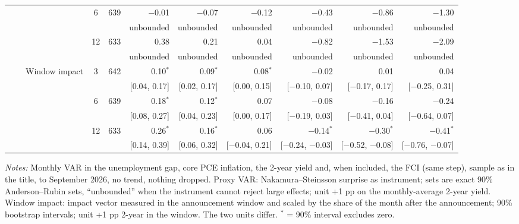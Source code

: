 \begin{table}[tp]
{\begin{tabular}{lllcrrrrrrr}
 &  &  & 6 & 639 & $-$0.01 & $-$0.07 & $-$0.12 & $-$0.43 & $-$0.86 & $-$1.30\\
 & & & & & {\tiny unbounded} & {\tiny unbounded} & {\tiny unbounded} & {\tiny unbounded} & {\tiny unbounded} & {\tiny unbounded}\\
 &  &  & 12 & 633 & 0.38 & 0.21 & 0.04 & $-$0.82 & $-$1.53 & $-$2.09\\
 & & & & & {\tiny unbounded} & {\tiny unbounded} & {\tiny unbounded} & {\tiny unbounded} & {\tiny unbounded} & {\tiny unbounded}\\
 &  & Window impact & 3 & 642 & 0.10$^{*}$ & 0.09$^{*}$ & 0.08$^{*}$ & $-$0.02 & 0.01 & 0.04\\
 & & & & & {\tiny [0.04, 0.17]} & {\tiny [0.02, 0.17]} & {\tiny [0.00, 0.15]} & {\tiny [$-$0.10, 0.07]} & {\tiny [$-$0.17, 0.17]} & {\tiny [$-$0.25, 0.31]}\\
 &  &  & 6 & 639 & 0.18$^{*}$ & 0.12$^{*}$ & 0.07 & $-$0.08 & $-$0.16 & $-$0.24\\
 & & & & & {\tiny [0.08, 0.27]} & {\tiny [0.04, 0.23]} & {\tiny [0.00, 0.17]} & {\tiny [$-$0.19, 0.03]} & {\tiny [$-$0.41, 0.04]} & {\tiny [$-$0.64, 0.07]}\\
 &  &  & 12 & 633 & 0.26$^{*}$ & 0.16$^{*}$ & 0.06 & $-$0.14$^{*}$ & $-$0.30$^{*}$ & $-$0.41$^{*}$\\
 & & & & & {\tiny [0.14, 0.39]} & {\tiny [0.06, 0.32]} & {\tiny [$-$0.04, 0.21]} & {\tiny [$-$0.24, $-$0.03]} & {\tiny [$-$0.52, $-$0.08]} & {\tiny [$-$0.76, $-$0.07]}\\
\bottomrule\end{tabular}}
\begin{flushleft}\footnotesize\textit{Notes:} Monthly VAR in the unemployment gap, core PCE inflation, the 2-year yield and, when included, the FCI (same step), sample as in the title, to September 2026, no trend, nothing dropped. Proxy VAR: Nakamura--Steinsson surprise as instrument; sets are exact 90\% Anderson--Rubin sets, ``unbounded'' when the instrument cannot reject large effects; unit +1 pp on the monthly-average 2-year yield. Window impact: impact vector measured in the announcement window and scaled by the share of the month after the announcement; 90\% bootstrap intervals; unit +1 pp 2-year in the window. The two units differ. $^{*}$ = 90\% interval excludes zero.\end{flushleft}
\end{table}
